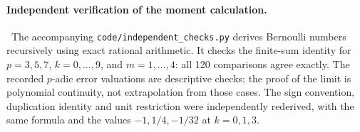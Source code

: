 \paragraph{Independent verification of the moment calculation.}
\oursComputed\ The accompanying \texttt{code/independent\_checks.py} derives
Bernoulli numbers recursively using exact rational arithmetic. It checks the
finite-sum identity for \(p=3,5,7\), \(k=0,\ldots,9\), and \(m=1,\ldots,4\):
all 120 comparisons agree exactly. The recorded \(p\)-adic error valuations
are descriptive checks; the proof of the limit is polynomial continuity,
not extrapolation from those cases. The sign convention, duplication
identity and unit restriction were independently rederived, with the same
formula and the values \(-1,1/4,-1/32\) at \(k=0,1,3\).

